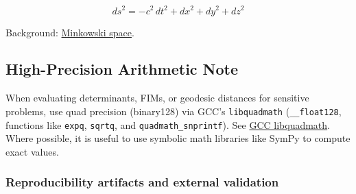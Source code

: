 \documentclass[
  10pt,
]{article}
\begin{document}
\begin{equation}\label{eq:supp_minkowski}
ds^2 = -c^2\,dt^2 + dx^2 + dy^2 + dz^2
\end{equation}

Background:
\href{https://en.wikipedia.org/wiki/Minkowski_space}{Minkowski space}.

\hypertarget{high-precision-arithmetic-note}{%
\subsection{High-Precision Arithmetic
Note}\label{high-precision-arithmetic-note}}

When evaluating determinants, FIMs, or geodesic distances for sensitive
problems, use quad precision (binary128) via GCC's \texttt{libquadmath}
(\texttt{\_\_float128}, functions like \texttt{expq}, \texttt{sqrtq},
and \texttt{quadmath\_snprintf}). See
\href{https://gcc.gnu.org/onlinedocs/libquadmath/index.html}{GCC
libquadmath}. Where possible, it is useful to use symbolic math
libraries like SymPy to compute exact values.

\hypertarget{reproducibility-artifacts-and-external-validation}{%
\subsubsection{Reproducibility artifacts and external
validation}\label{reproducibility-artifacts-and-external-validation}}
\end{document}
